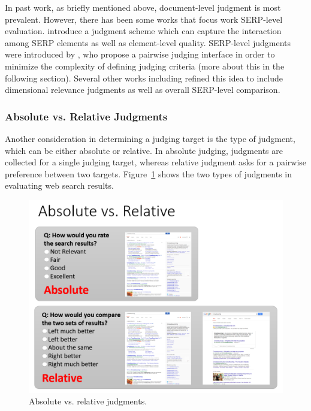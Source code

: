 In past work, as briefly mentioned above, document-level judgment is most prevalent. However, there has been some works that focus work SERP-level evaluation. \cite{Bailey2010} introduce a judgment scheme which can capture the interaction among SERP elements as well as element-level quality. 
%
SERP-level judgments were introduced by \cite{Thomas2006}, who propose a pairwise judging interface in order to minimize the complexity of defining judging criteria (more about this in the following section). Several other works including  \cite{Kim:2013} refined this idea to include dimensional relevance judgments as well as overall SERP-level comparison.

\subsubsection{Absolute vs. Relative Judgments}
Another consideration in determining a judging target is the type of judgment, which can be either absolute or relative. In absolute judging, judgments are collected for a single judging target, whereas relative judgment asks for a pairwise preference between two targets. Figure~\ref{fig:judgment_types} shows the two types of judgments in evaluating web search results.

\begin{figure}
	\begin{center}
		\includegraphics[scale=0.5]{images/judgment_types}
		\caption{Absolute vs. relative judgments.} 
		\label{fig:judgment_types}
	\end{center}
\end{figure}

